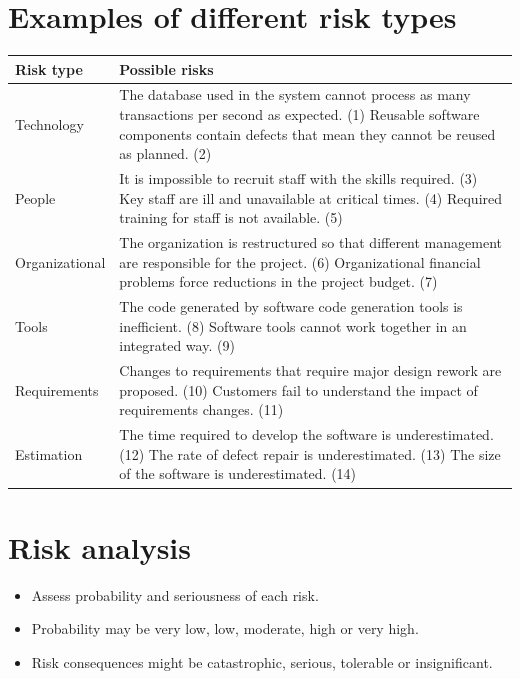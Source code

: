 \section{ Examples of different risk types}
\begin{table}[h!]
\centering
\begin{tabular}{ |p{3cm}|p{8cm}|  }
\hline
Risk type & Possible risks \\
\hline
\hline
Technology & The database used in the system cannot process as many transactions per second as expected. (1)
Reusable software components contain defects that mean they cannot be reused as planned. (2)\\
\hline
People & It is impossible to recruit staff with the skills required. (3) Key staff are ill and unavailable at critical times. (4) Required training for staff is not available. (5)\\
\hline
Organizational & The organization is restructured so that different management are responsible for the project. (6)
Organizational financial problems force reductions in the project budget. (7)\\
\hline
Tools & The code generated by software code generation tools is inefficient. (8) Software tools cannot work together in an integrated way. (9)\\
\hline
Requirements & Changes to requirements that require major design rework are proposed. (10) Customers fail to understand the impact of requirements changes. (11)\\
\hline
Estimation & The time required to develop the software is underestimated. (12) The rate of defect repair is underestimated. (13)
The size of the software is underestimated. (14)\\

\hline
\end{tabular}

\label{table:T5_2}
\end{table}

\section{ Risk analysis}
\begin{itemize}

\item Assess probability and seriousness of each risk.

\item Probability may be very low, low, moderate, high or very high.

\item Risk consequences might be catastrophic, serious, tolerable or insignificant.


\end{itemize}
\newpage
